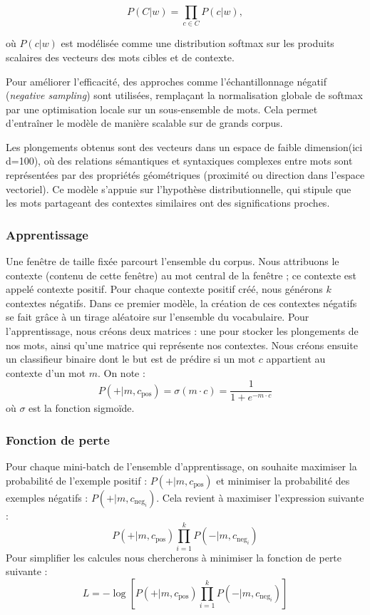 \documentclass[12pt]{article}
\begin{document}
\[
P(C|w) = \prod_{c \in C} P(c|w),
\]

où $P(c|w)$ est modélisée comme une distribution softmax sur les produits scalaires des vecteurs des mots cibles et de contexte. 

Pour améliorer l'efficacité, des approches comme l’échantillonnage négatif (\textit{negative sampling}) sont utilisées, remplaçant 
la normalisation globale de softmax par une optimisation locale sur un sous-ensemble de mots. Cela permet d’entraîner le modèle de manière scalable sur de grands corpus. 

Les plongements obtenus sont des vecteurs dans un espace de faible dimension(ici d=100), où des relations sémantiques et syntaxiques complexes entre mots 
sont représentées par des propriétés géométriques (proximité ou direction dans l’espace vectoriel). Ce modèle s’appuie sur l’hypothèse distributionnelle, qui 
stipule que les mots partageant des contextes similaires ont des significations proches.

\subsubsection{Apprentissage}
Une fenêtre de taille fixée parcourt l'ensemble du corpus. Nous attribuons le contexte (contenu de cette fenêtre) au mot central de la fenêtre ; ce contexte est 
appelé contexte positif. Pour chaque contexte positif créé, nous générons \( k \) contextes négatifs. Dans ce premier modèle, la création de ces contextes négatifs 
se fait grâce à un tirage aléatoire sur l'ensemble du vocabulaire. Pour l'apprentissage, nous créons deux matrices : une pour stocker les plongements de nos mots, 
ainsi qu'une matrice qui représente nos contextes. Nous créons ensuite un classifieur binaire dont le but est de prédire si un mot \( c \) appartient au contexte d'un mot \( m \). On note :
\[
    P(+|m, c_{\text{pos}}) = \sigma( m \cdot c) = \frac{1}{1+e^{-m \cdot c}}
\]
où \( \sigma \) est la fonction sigmoïde.


\subsubsection{Fonction de perte}
Pour chaque mini-batch de l’ensemble d’apprentissage, on souhaite maximiser la probabilité de l’exemple positif : 
$P(+|m, c_{\text{pos}})$ et minimiser la probabilité des exemples négatifs : $P(+|m, c_{\text{neg}_i})$. Cela revient à maximiser l’expression suivante :
\[
P(+|m, c_{\text{pos}}) \prod_{i=1}^{k} P(-|m, c_{\text{neg}_i})
\]
Pour simplifier les calcules nous chercherons à minimiser la fonction de perte suivante : 
\[
L = - \log \left[ P(+|m, c_{\text{pos}}) \prod_{i=1}^{k} P(-|m, c_{\text{neg}_i}) \right]
\]
\end{document}
